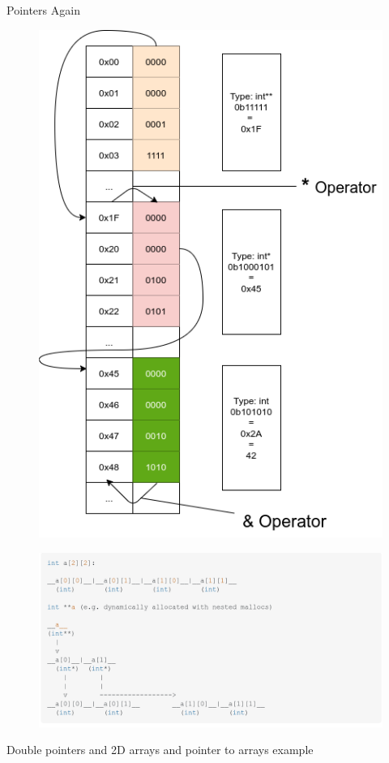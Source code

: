 \documentclass[10pt]{beamer}
\begin{document}
\begin{frame}{Pointers Again}
    \begin{figure}
        \includegraphics[keepaspectratio, width=\textwidth, height=\textheight-2\baselineskip-2\baselineskip]{img/double_ptr.png} \\
    \end{figure}
    \framebreak
    
    \begin{figure}
        \includegraphics[keepaspectratio, width=\textwidth, height=\textheight-2\baselineskip-2\baselineskip]{img/double_ptr_mem.png} \\
    \end{figure}
    \framebreak
    Double pointers and 2D arrays and pointer to arrays example
\end{frame}
\end{document}
